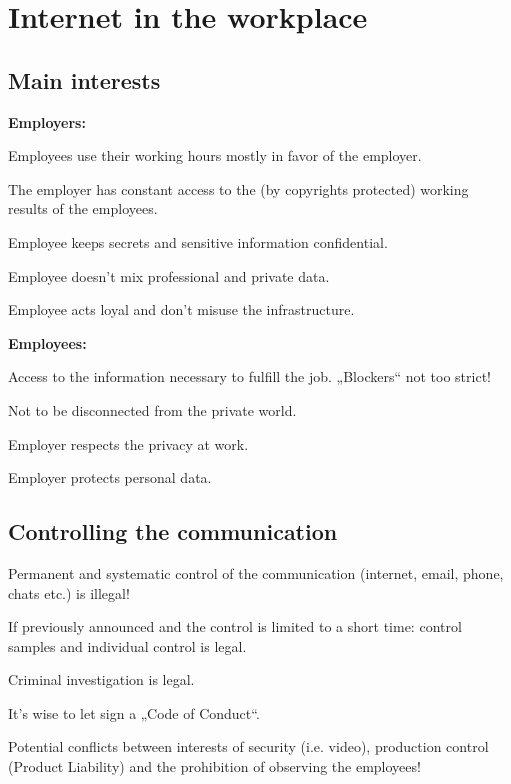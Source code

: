 \section{Internet in the workplace}
\subsection{Main interests}
\textbf{Employers:}
\begin{compactitem}
	\item Employees use their working hours mostly in favor of the	employer.
	\item The employer has constant access to the (by copyrights protected) working results of the employees.
	\item Employee keeps secrets and sensitive information confidential.
	\item Employee doesn’t mix professional and private data.
	\item Employee acts loyal and don’t misuse the infrastructure.
\end{compactitem}
\textbf{Employees:}
\begin{compactitem}
	\item Access to the information necessary to fulfill the job. „Blockers“ not too strict!
	\item Not to be disconnected from the private world.
	\item Employer respects the privacy at work.
	\item Employer protects personal data.
\end{compactitem}

\subsection{Controlling the communication}
\begin{compactitem}
	\item Permanent and systematic control of the communication (internet, email, phone, chats etc.) is illegal!
	\item If previously announced and the control is limited to a short time: control samples and individual control is legal.
	\item Criminal investigation is legal.
	\item It’s wise to let sign a „Code of Conduct“.
	\item Potential conflicts between interests of security (i.e. video), production control (Product Liability) and the prohibition of observing the employees!
\end{compactitem}

